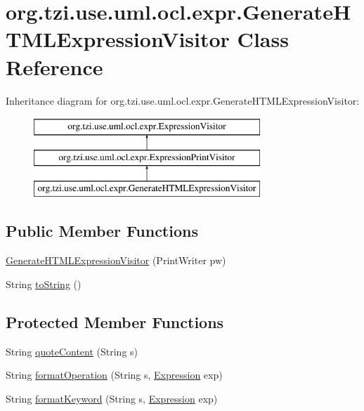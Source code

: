 \hypertarget{classorg_1_1tzi_1_1use_1_1uml_1_1ocl_1_1expr_1_1_generate_h_t_m_l_expression_visitor}{\section{org.\-tzi.\-use.\-uml.\-ocl.\-expr.\-Generate\-H\-T\-M\-L\-Expression\-Visitor Class Reference}
\label{classorg_1_1tzi_1_1use_1_1uml_1_1ocl_1_1expr_1_1_generate_h_t_m_l_expression_visitor}
}
Inheritance diagram for org.\-tzi.\-use.\-uml.\-ocl.\-expr.\-Generate\-H\-T\-M\-L\-Expression\-Visitor\-:\begin{figure}[H]
\begin{center}
\leavevmode
\includegraphics[height=3.000000cm]{classorg_1_1tzi_1_1use_1_1uml_1_1ocl_1_1expr_1_1_generate_h_t_m_l_expression_visitor}
\end{center}
\end{figure}
\subsection*{Public Member Functions}
\begin{DoxyCompactItemize}
\item 
\hyperlink{classorg_1_1tzi_1_1use_1_1uml_1_1ocl_1_1expr_1_1_generate_h_t_m_l_expression_visitor_a3c528167f6bae46e49a2b65b187d59f5}{Generate\-H\-T\-M\-L\-Expression\-Visitor} (Print\-Writer pw)
\item 
String \hyperlink{classorg_1_1tzi_1_1use_1_1uml_1_1ocl_1_1expr_1_1_generate_h_t_m_l_expression_visitor_afde8c57615d75713aee064970b951282}{to\-String} ()
\end{DoxyCompactItemize}
\subsection*{Protected Member Functions}
\begin{DoxyCompactItemize}
\item 
String \hyperlink{classorg_1_1tzi_1_1use_1_1uml_1_1ocl_1_1expr_1_1_generate_h_t_m_l_expression_visitor_a0ce5f53e322e74acf03fdef425f24279}{quote\-Content} (String s)
\item 
String \hyperlink{classorg_1_1tzi_1_1use_1_1uml_1_1ocl_1_1expr_1_1_generate_h_t_m_l_expression_visitor_a52d419a2d5f2a75c1b46a4ef3a646465}{format\-Operation} (String s, \hyperlink{classorg_1_1tzi_1_1use_1_1uml_1_1ocl_1_1expr_1_1_expression}{Expression} exp)
\item 
String \hyperlink{classorg_1_1tzi_1_1use_1_1uml_1_1ocl_1_1expr_1_1_generate_h_t_m_l_expression_visitor_a26775335a2fd2255f63ebe30b11a2737}{format\-Keyword} (String s, \hyperlink{classorg_1_1tzi_1_1use_1_1uml_1_1ocl_1_1expr_1_1_expression}{Expression} exp)
\end{DoxyCompactItemize}
